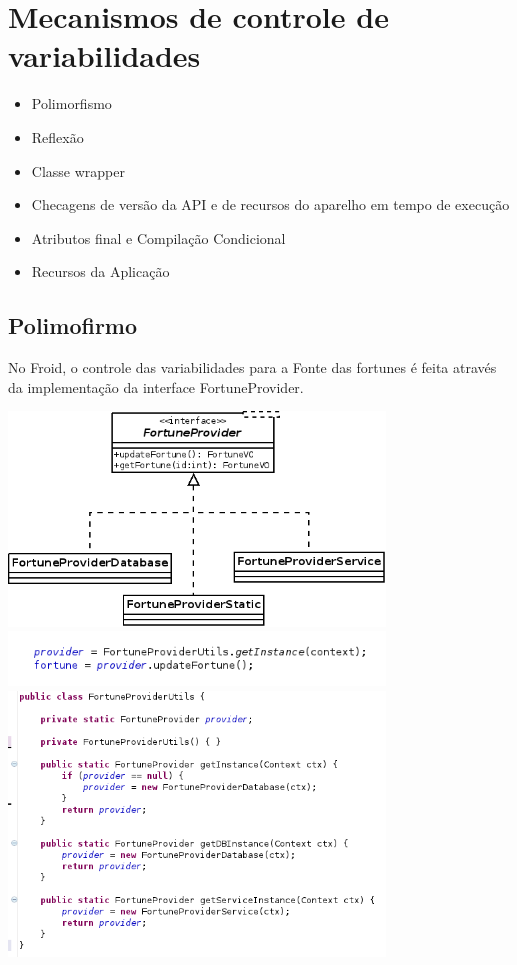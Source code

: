 \documentclass[a4paper,12pt]{report}
\begin{document}
\section{Mecanismos de controle de variabilidades}
\begin{itemize}
    \item  Polimorfismo
    \item Reflexão
    \item Classe wrapper
    \item Checagens de versão da API e de recursos do aparelho em tempo de execução
    \item Atributos final e Compilação Condicional 
    \item Recursos da Aplicação
\end{itemize}

\subsection{Polimofirmo}
No Froid, o controle das variabilidades para a Fonte das fortunes é feita através 
da implementação da interface FortuneProvider.

\includegraphics[width=10cm]{img/implementacao_FortuneProvider}
\includegraphics[width=10cm]{img/instaciando_provider}
\includegraphics[width=10cm]{img/FortuneProviderUtils}
\end{document}
